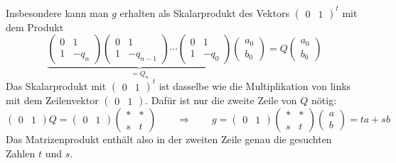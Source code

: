 Insbesondere kann man $g$ erhalten als Skalarprodukt des Vektors
$\begin{pmatrix}0&1\end{pmatrix}^t$ mit dem Produkt
\[
\underbrace{
\begin{pmatrix} 0&1 \\ 1&-q_n\end{pmatrix}
\begin{pmatrix} 0&1 \\ 1&-q_{n-1}\end{pmatrix}
\cdots
\begin{pmatrix} 0&1 \\ 1&-q_{0}\end{pmatrix}
}_{\displaystyle = Q_n}
\begin{pmatrix}a_0\\b_0\end{pmatrix}
=
Q \begin{pmatrix}a_0\\b_0\end{pmatrix}
\]
Das Skalarprodukt mit
$\begin{pmatrix}0&1\end{pmatrix}^t$ ist dasselbe wie die Multiplikation
von links mit dem Zeilenvektor $\begin{pmatrix}0&1\end{pmatrix}$.
Dafür ist nur die zweite Zeile von $Q$ nötig:
\[
\begin{pmatrix}0&1\end{pmatrix}
Q
=
\begin{pmatrix}0&1\end{pmatrix}
\begin{pmatrix}
*&*\\
s&t
\end{pmatrix}
\qquad\Rightarrow\qquad
g
=
\begin{pmatrix}0&1\end{pmatrix}
\begin{pmatrix}
*&*\\
s&t
\end{pmatrix}
\begin{pmatrix}a\\b\end{pmatrix}
=
ta+sb
\]
Das Matrizenprodukt enthält also in der zweiten Zeile genau die
gesuchten Zahlen $t$ und $s$.

